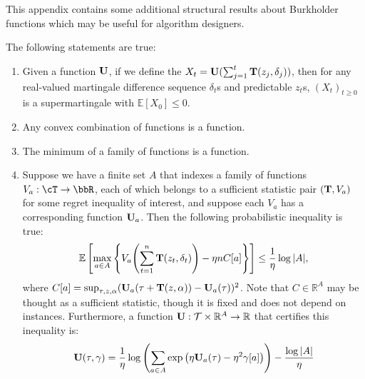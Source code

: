 
This appendix contains some additional structural results about Burkholder functions which may be useful for algorithm designers.

\begin{proposition}
\label{prop:algebra}
The following statements are true:
\begin{enumerate}
\item Given a \Bfun function $\mathbf{U}$, if we define the $X_t = \mathbf{U}(\sum_{j=1}^t \mathbf{T}(z_j,\delta_j))$, then for any real-valued martingale difference sequence $\delta_t$s and predictable $z_t$s, $(X_t)_{t \ge 0}$ is a supermartingale with $\mathbb{E}[X_0] \le 0$.
\item Any convex combination of \Bfun functions is a \Bfun function.
\item The minimum of a family of \Bfun functions is a \Bfun function.
\item Suppose we have a finite set $A$ that indexes a family of functions $V_a:\cT\to\bbR$, each of which belongs to a sufficient statistic pair $(\mathbf{T}, V_a)$ for some regret inequality of interest, and suppose each $V_a$ has a corresponding \Bfun function $\mathbf{U}_a$.  Then the following probabilistic inequality is true:
$$
\mathbb{E}\left[\max_{a \in A} \left\{V_a\prn*{\sum_{t=1}^n \suff(z_t,\delta_t)} - \eta n C[a] \right\}\right]  \le \frac{1}{\eta}\log |A|,
$$
where $C[a] = \sup_{\tau, z ,\alpha} (\mathbf{U}_a(\tau + \mathbf{T}(z,\alpha)) - \mathbf{U}_a(\tau))^2$. Note that $C \in \mathbb{R}^A$ may be thought as a sufficient statistic, though it is fixed and does not depend on instances.
Furthermore, a \Bfun function $\mathbf{U}: \mathcal{T} \times \mathbb{R}^A \to {\mathbb R}$ that certifies this inequality is:
\begin{equation}
\label{eq:burkholder_meta}
\mathbf{U}(\tau, \gamma) = \frac{1}{\eta} \log\left(\sum_{a \in A} \exp\left(\eta \mathbf{U}_a(\tau) - \eta^2 \gamma[a] \right)\right)  - \frac{\log|A|}{\eta}
\end{equation}
\end{enumerate}
\end{proposition}
